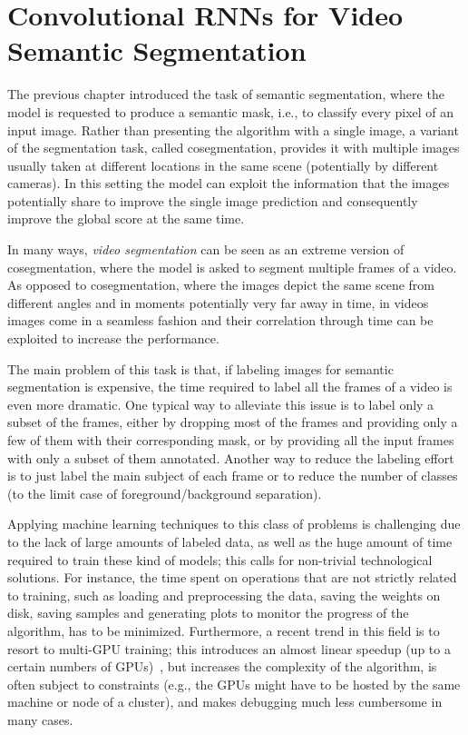 \chapter{Convolutional RNNs for Video Semantic Segmentation}\label{sec:video_segmentation}

The previous chapter introduced the task of semantic segmentation, where the
model is requested to produce a semantic mask, i.e., to classify every pixel of
an input image. Rather than presenting the algorithm with a single image, a
variant of the segmentation task, called cosegmentation, provides it with
multiple images usually taken at different locations in the same scene
(potentially by different cameras). In this setting the model can exploit the
information that the images potentially share to improve the single image
prediction and consequently improve the global score at the same time.

In many ways, \emph{video segmentation} can be seen as an extreme version of
cosegmentation, where the model is asked to segment multiple frames of a video.
As opposed to cosegmentation, where the images depict the same scene from
different angles and in moments potentially very far away in time, in videos
images come in a seamless fashion and their correlation through time can be
exploited to increase the performance.

The main problem of this task is that, if labeling images for semantic
segmentation is expensive, the time required to label all the frames of a
video is even more dramatic. One typical way to alleviate this issue is to
label only a subset of the frames, either by dropping most of the frames and
providing only a few of them with their corresponding mask, or by providing all
the input frames with only a subset of them annotated. Another way to reduce
the labeling effort is to just label the main subject of each frame or to
reduce the number of classes (to the limit case of foreground/background
separation).

Applying machine learning techniques to this class of problems is challenging
due to the lack of large amounts of labeled data, as well as the huge amount of
time required to train these kind of models; this calls for non-trivial
technological solutions. For instance, the time spent on operations that are
not strictly related to training, such as loading and preprocessing the data,
saving the weights on disk, saving samples and generating plots to monitor the
progress of the algorithm, has to be minimized. Furthermore, a recent trend in
this field is to resort to multi-GPU training; this introduces an almost linear
speedup (up to a certain numbers of GPUs)~\citep{theano2016short,ma2016theano},
but increases the complexity of the algorithm, is often subject to constraints
(e.g., the GPUs might have to be hosted by the same machine or node of a
cluster), and makes debugging much less cumbersome in many cases.

